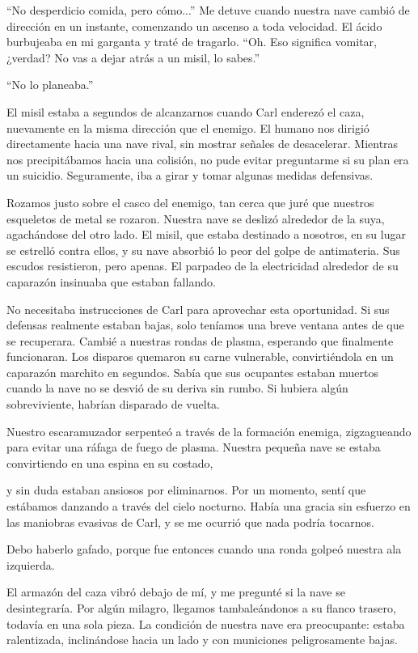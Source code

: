 “No desperdicio comida, pero cómo...” Me detuve cuando nuestra nave cambió de dirección en un instante, comenzando un ascenso a toda velocidad. El ácido burbujeaba en mi garganta y traté de tragarlo. “Oh. Eso significa vomitar, ¿verdad? No vas a dejar atrás a un misil, lo sabes.”

“No lo planeaba.”

El misil estaba a segundos de alcanzarnos cuando Carl enderezó el caza, nuevamente en la misma dirección que el enemigo. El humano nos dirigió directamente hacia una nave rival, sin mostrar señales de desacelerar. Mientras nos precipitábamos hacia una colisión, no pude evitar preguntarme si su plan era un suicidio. Seguramente, iba a girar y tomar algunas medidas defensivas.

Rozamos justo sobre el casco del enemigo, tan cerca que juré que nuestros esqueletos de metal se rozaron. Nuestra nave se deslizó alrededor de la suya, agachándose del otro lado. El misil, que estaba destinado a nosotros, en su lugar se estrelló contra ellos, y su nave absorbió lo peor del golpe de antimateria. Sus escudos resistieron, pero apenas. El parpadeo de la electricidad alrededor de su caparazón insinuaba que estaban fallando.

No necesitaba instrucciones de Carl para aprovechar esta oportunidad. Si sus defensas realmente estaban bajas, solo teníamos una breve ventana antes de que se recuperara. Cambié a nuestras rondas de plasma, esperando que finalmente funcionaran. Los disparos quemaron su carne vulnerable, convirtiéndola en un caparazón marchito en segundos. Sabía que sus ocupantes estaban muertos cuando la nave no se desvió de su deriva sin rumbo. Si hubiera algún sobreviviente, habrían disparado de vuelta.

Nuestro escaramuzador serpenteó a través de la formación enemiga, zigzagueando para evitar una ráfaga de fuego de plasma. Nuestra pequeña nave se estaba convirtiendo en una espina en su costado,

y sin duda estaban ansiosos por eliminarnos. Por un momento, sentí que estábamos danzando a través del cielo nocturno. Había una gracia sin esfuerzo en las maniobras evasivas de Carl, y se me ocurrió que nada podría tocarnos.

Debo haberlo gafado, porque fue entonces cuando una ronda golpeó nuestra ala izquierda.

El armazón del caza vibró debajo de mí, y me pregunté si la nave se desintegraría. Por algún milagro, llegamos tambaleándonos a su flanco trasero, todavía en una sola pieza. La condición de nuestra nave era preocupante: estaba ralentizada, inclinándose hacia un lado y con municiones peligrosamente bajas.

